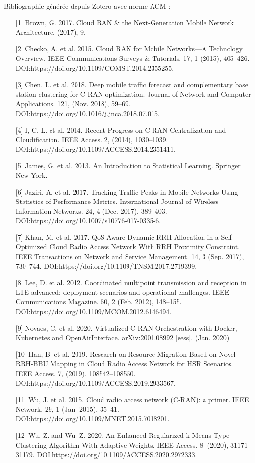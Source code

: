 \documentclass{article}
\begin{document}
\paragraph{}Bibliographie générée depuis Zotero avec norme ACM : \\
\begin{enumerate}
\item[{[1]}] Brown, G. 2017. Cloud RAN & the Next-Generation Mobile Network Architecture. (2017), 9.
\item[{[2]}] Checko, A. et al. 2015. Cloud RAN for Mobile Networks—A Technology Overview. IEEE Communications Surveys & Tutorials. 17, 1 (2015), 405–426. DOI:https://doi.org/10.1109/COMST.2014.2355255.
\item[{[3]}] Chen, L. et al. 2018. Deep mobile traffic forecast and complementary base station clustering for C-RAN optimization. Journal of Network and Computer Applications. 121, (Nov. 2018), 59–69. DOI:https://doi.org/10.1016/j.jnca.2018.07.015.
\item[{[4]}] I, C.-L. et al. 2014. Recent Progress on C-RAN Centralization and Cloudification. IEEE Access. 2, (2014), 1030–1039. DOI:https://doi.org/10.1109/ACCESS.2014.2351411.
\item[{[5]}] James, G. et al. 2013. An Introduction to Statistical Learning. Springer New York.
\item[{[6]}] Jaziri, A. et al. 2017. Tracking Traffic Peaks in Mobile Networks Using Statistics of Performance Metrics. International Journal of Wireless Information Networks. 24, 4 (Dec. 2017), 389–403. DOI:https://doi.org/10.1007/s10776-017-0335-6.
\item[{[7]}] Khan, M. et al. 2017. QoS-Aware Dynamic RRH Allocation in a Self-Optimized Cloud Radio Access Network With RRH Proximity Constraint. IEEE Transactions on Network and Service Management. 14, 3 (Sep. 2017), 730–744. DOI:https://doi.org/10.1109/TNSM.2017.2719399.
\item[{[8]}] Lee, D. et al. 2012. Coordinated multipoint transmission and reception in LTE-advanced: deployment scenarios and operational challenges. IEEE Communications Magazine. 50, 2 (Feb. 2012), 148–155. DOI:https://doi.org/10.1109/MCOM.2012.6146494.
\item[{[9]}] Novaes, C. et al. 2020. Virtualized C-RAN Orchestration with Docker, Kubernetes and OpenAirInterface. arXiv:2001.08992 [eess]. (Jan. 2020).
\item[{[10]}] Han, B. et al. 2019. Research on Resource Migration Based on Novel RRH-BBU Mapping in Cloud Radio Access Network for HSR Scenarios. IEEE Access. 7, (2019), 108542–108550. DOI:https://doi.org/10.1109/ACCESS.2019.2933567.
\item[{[11]}] Wu, J. et al. 2015. Cloud radio access network (C-RAN): a primer. IEEE Network. 29, 1 (Jan. 2015), 35–41. DOI:https://doi.org/10.1109/MNET.2015.7018201.
\item[{[12]}] Wu, Z. and Wu, Z. 2020. An Enhanced Regularized k-Means Type Clustering Algorithm With Adaptive Weights. IEEE Access. 8, (2020), 31171–31179. DOI:https://doi.org/10.1109/ACCESS.2020.2972333.
\end{enumerate}
\end{document}
